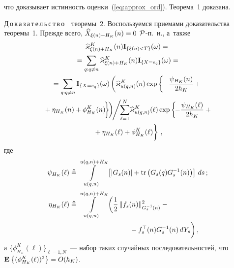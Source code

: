 \begin{multicols}{2}
{\noindent
что доказывает истинность оценки~(\ref{eq:approx_ord}).
 Теорема~1 дока\-зана.

\smallskip

\noindent
Д\,о\,к\,а\,з\,а\,т\,е\,л\,ь\,с\,т\,в\,о\ \ теоремы~2. 
Воспользуемся приемами доказательства теоремы~1. Прежде всего, 
$\widehat{X}_{\xi(n)+H_K}(n)\hm=0$ ${\mathcal P}$-п.~н., а~также
\begin{multline*}
\widehat{\varkappa}^K_{\xi(n)+H_K}(n)\mathbf{I}_{\{\xi(n)<T\}}(\omega)={}\\[1pt]
{}=
\sum\limits_{q:q\neq n}\widehat{\varkappa}^K_{\xi(n)+H_K}(n)\mathbf{I}_{\{X=e_q\}}
(\omega)= {}\\[1pt] 
{}=
\sum\limits_{q:q\neq n} \mathbf{I}_{\{X=e_q\}}(\omega)
\left(\widehat{\varkappa}^K_{u(q,n)}(n)\exp\left\{
-\fr{\psi_{H_K}(n)}{2h_K}+{}\right.\right.\\[1pt]
\!\left.\left.{}+\eta_{H_K}(n)+\phi_{H_K}^K(n)
\vphantom{\fr{\psi_{H_K}(n)}{2h_K}}\!
\right\}\!
\right)\!\!\Bigg/ \!\!
\sum\limits_{\ell=1}^N\!
\widehat{\varkappa}^K_{u(q,n)}(\ell)\exp\left\{\!
-\fr{\psi_{H_K}(\ell)}{2h_K}
+{}\right.\hspace*{-1.55pt}\\[1pt]
\left.{}+\eta_{H_K}(\ell)+\phi_{H_K}^K(\ell)
\vphantom{\fr{\psi_{H_K}(n)}{2h_K}}
\right\}\,,
 \end{multline*}
 где
 \begin{align*}
 \psi_{H_K}(\ell) &\triangleq
\displaystyle \int\limits_{u(q,n)}^{u(q,n)+H_K}\left[
\left\vert G_s(n)\right\vert
+
\mathrm{tr}\left(G_s(q) G_s^{-1}(n)
\right)
\right]\,ds\,;
 \\[1pt]
  \eta_{H_K}(\ell) &\triangleq
\int\limits_{u(q,n)}^{u(q,n)+H_K}
  \left(
{\fr{1}{2}}\,\|f_s(n)\|^2_{G^{-1}_s(n)}-{}\right.\\
&\hspace*{30mm}\left.{}-f_s^{\top}(n)G^{-1}_s(n)\,dY_s
  \vphantom{\fr{1}{2}}\right),
 \end{align*}
 а $\{\phi_{H_K}^K(\ell)\}_{\ell=\overline{1,N}}$~--- 
 набор таких случайных последовательностей, что $\me{}{(\phi_{H_K}^K(\ell))^2}\hm=O(h_K)$.

}
\end{multicols}

